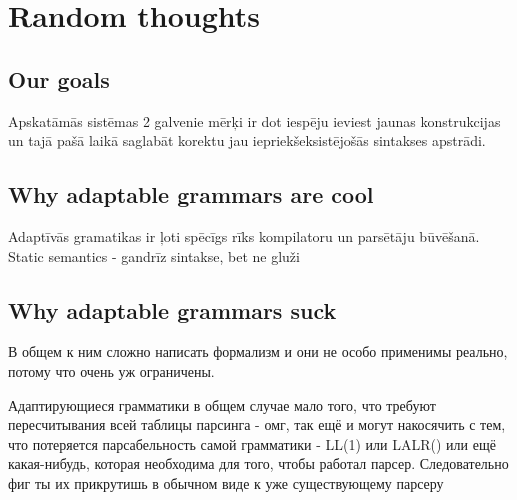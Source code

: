 \section{Random thoughts}
\subsection{Our goals}
Apskatāmās sistēmas 2 galvenie mērķi ir dot iespēju ieviest jaunas konstrukcijas un tajā pašā laikā saglabāt korektu jau iepriekšeksistējošās sintakses apstrādi.

\subsection{Why adaptable grammars are cool}
Adaptīvās gramatikas ir ļoti spēcīgs rīks kompilatoru un parsētāju būvēšanā. 
Static semantics - gandrīz sintakse, bet ne gluži

\subsection{Why adaptable grammars suck}
В общем к ним сложно написать формализм и они не особо применимы реально, потому что очень уж ограничены.

Адаптирующиеся грамматики в общем случае мало того, что требуют пересчитывания всей таблицы парсинга - омг, так ещё и могут накосячить с тем, что потеряется парсабельность самой грамматики - LL(1) или LALR() или ещё какая-нибудь, которая необходима для того, чтобы работал парсер. Следовательно фиг ты их прикрутишь в обычном виде к уже существующему парсеру \cite{Christiansen:SurveyAdaptableGrammars}